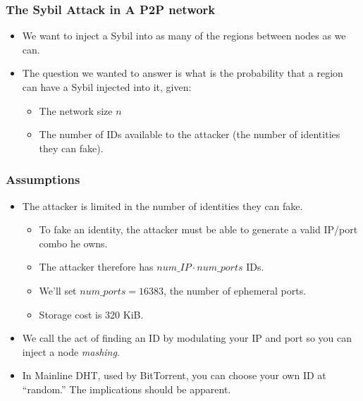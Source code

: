 \documentclass[11pt]{beamer}
\begin{document}


\begin{frame}
	\frametitle{The Sybil Attack in A P2P network}
	\begin{itemize}
		\item We want to inject a Sybil into as many of the regions between nodes as we can.
		\item The question we wanted to answer is what is the probability that a region can have a Sybil injected into it, given:
		\begin{itemize}
			\item The network size $n$
			\item The number of IDs available to the attacker (the number of identities they can fake).
		\end{itemize}
	\end{itemize}
	\end{frame} 
       
\begin{frame}
\frametitle{Assumptions}
	\begin{itemize}
		\item The attacker is limited in the number of identities they can fake.		
		\begin{itemize}
			\item To fake an identity, the attacker must be able to generate a valid IP/port combo he owns.
			\item The attacker therefore has $num\_IP \cdot num\_ports$ IDs.
			\item We'll set $ num\_ports = 16383 $, the number of ephemeral ports.
			\item Storage cost is 320 KiB.
		\end{itemize}
		\item We call the act of finding an ID by modulating your IP and port so you can inject a node \emph{mashing}.
		\item In Mainline DHT, used by BitTorrent, you can choose your own ID at ``random.''   The implications should be apparent.
	
	\end{itemize}
\end{frame}
\end{document}
